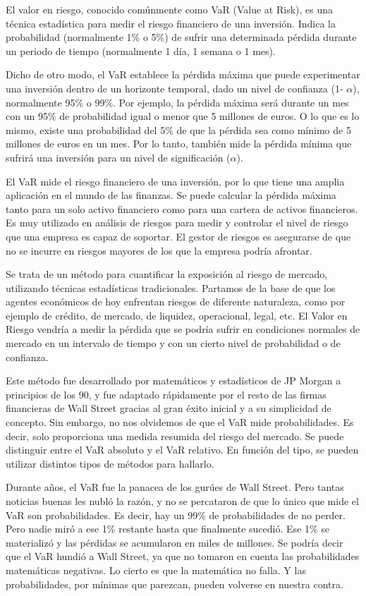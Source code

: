 \documentclass[
  12pt,
]{krantz}
\begin{document}
El valor en riesgo, conocido comúnmente como VaR (Value at Risk), es una técnica estadística para medir el riesgo financiero de una inversión. Indica la probabilidad (normalmente 1\% o 5\%) de sufrir una determinada pérdida durante un periodo de tiempo (normalmente 1 día, 1 semana o 1 mes).

Dicho de otro modo, el VaR establece la pérdida máxima que puede experimentar una inversión dentro de un horizonte temporal, dado un nivel de confianza (1- \(\alpha\)), normalmente 95\% o 99\%. Por ejemplo, la pérdida máxima será durante un mes con un 95\% de probabilidad igual o menor que 5 millones de euros. O lo que es lo mismo, existe una probabilidad del 5\% de que la pérdida sea como mínimo de 5 millones de euros en un mes. Por lo tanto, también mide la pérdida mínima que sufrirá una inversión para un nivel de significación (\(\alpha\)).

El VaR mide el riesgo financiero de una inversión, por lo que tiene una amplia aplicación en el mundo de las finanzas. Se puede calcular la pérdida máxima tanto para un solo activo financiero como para una cartera de activos financieros. Es muy utilizado en análisis de riesgos para medir y controlar el nivel de riesgo que una empresa es capaz de soportar. El gestor de riesgos es asegurarse de que no se incurre en riesgos mayores de los que la empresa podría afrontar.

Se trata de un método para cuantificar la exposición al riesgo de mercado, utilizando técnicas estadísticas tradicionales. Partamos de la base de que los agentes económicos de hoy enfrentan riesgos de diferente naturaleza, como por ejemplo de crédito, de mercado, de liquidez, operacional, legal, etc. El Valor en Riesgo vendría a medir la pérdida que se podría sufrir en condiciones normales de mercado en un intervalo de tiempo y con un cierto nivel de probabilidad o de confianza.

Este método fue desarrollado por matemáticos y estadísticos de JP Morgan a principios de los 90, y fue adaptado rápidamente por el resto de las firmas financieras de Wall Street gracias al gran éxito inicial y a su simplicidad de concepto. Sin embargo, no nos olvidemos de que el VaR mide probabilidades. Es decir, solo proporciona una medida resumida del riesgo del mercado. Se puede distinguir entre el VaR absoluto y el VaR relativo. En función del tipo, se pueden utilizar distintos tipos de métodos para hallarlo.

Durante años, el VaR fue la panacea de los gurúes de Wall Street. Pero tantas noticias buenas les nubló la razón, y no se percataron de que lo único que mide el VaR son probabilidades. Es decir, hay un 99\% de probabilidades de no perder. Pero nadie miró a ese 1\% restante hasta que finalmente sucedió. Ese 1\% se materializó y las pérdidas se acumularon en miles de millones. Se podría decir que el VaR hundió a Wall Street, ya que no tomaron en cuenta las probabilidades matemáticas negativas. Lo cierto es que la matemática no falla. Y las probabilidades, por mínimas que parezcan, pueden volverse en nuestra contra.
\end{document}
